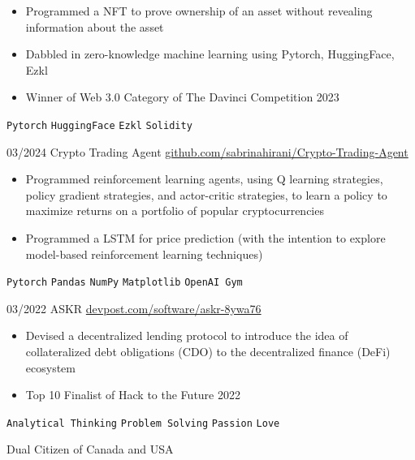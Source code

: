 \documentclass[9pt]{developercv} %
\begin{document}
\begin{entrylist}
{\begin{itemize}[itemsep=3pt,topsep=0pt,parsep=0pt,partopsep=0pt, leftmargin=-1pt]
            \item Programmed a NFT to prove ownership of an asset without revealing information about the asset
            \item Dabbled in zero-knowledge machine learning using Pytorch, HuggingFace, Ezkl
            \item Winner of Web 3.0 Category of The Davinci Competition 2023
        \end{itemize} 
        \vspace{5pt}
        \texttt{Pytorch} \slashsep \texttt{HuggingFace} \slashsep \texttt{Ezkl} \slashsep \texttt{Solidity}
        }
    \entry
		{03/2024}
		{Crypto Trading Agent}
		{\href{https://github.com/sabrinahirani/Crypto-Trading-Agent}{github.com/sabrinahirani/Crypto-Trading-Agent}}
		{
        \vspace{-10pt}
        \begin{itemize}[itemsep=3pt,topsep=0pt,parsep=0pt,partopsep=0pt, leftmargin=-1pt]
            \item Programmed reinforcement learning agents, using Q learning strategies, policy gradient strategies, and actor-critic strategies, to learn a policy to maximize returns on a portfolio of popular cryptocurrencies
            \item Programmed a LSTM for price prediction (with the intention to explore model-based reinforcement learning techniques)
        \end{itemize} 
        \vspace{5pt}
        \texttt{Pytorch} \slashsep \texttt{Pandas} \slashsep \texttt{NumPy} \slashsep \texttt{Matplotlib} \slashsep \texttt{OpenAI Gym}
        }
    \entry
		{03/2022}
		{ASKR}
		{\href{https://devpost.com/software/askr-8ywa76}{devpost.com/software/askr-8ywa76}}
		{
        \vspace{-10pt}
        \begin{itemize}[itemsep=3pt,topsep=0pt,parsep=0pt,partopsep=0pt, leftmargin=-1pt]
            \item Devised a decentralized lending protocol to introduce the idea of collateralized debt obligations (CDO) to the decentralized finance (DeFi) ecosystem
            \item Top 10 Finalist of Hack to the Future 2022
        \end{itemize} 
        \vspace{5pt}
        \texttt{Analytical Thinking} \slashsep \texttt{Problem Solving} \slashsep \texttt{Passion} \slashsep \texttt{Love}
        }
\end{entrylist}

\begin{center}
Dual Citizen of Canada and USA
\end{center}

\end{document}
